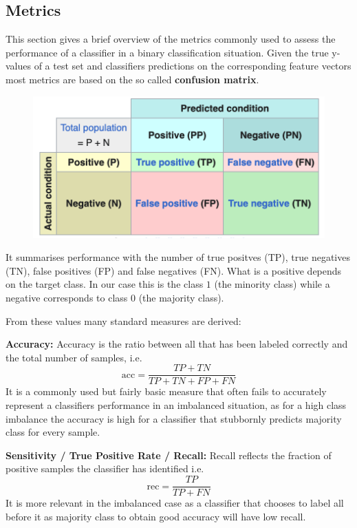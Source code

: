 
\subsection{Metrics}

This section gives a brief overview of the metrics commonly used to assess the performance of a classifier in a binary classification situation.
Given the true y-values of a test set and classifiers predictions on the corresponding feature vectors most metrics are based on the so called \textbf{confusion matrix}.

\begin{figure}[H]
	\centering
  	\includegraphics[width=0.75\linewidth]{assets/confusion_matrix.png}
  	\label{fig:confusion_matrix}
\end{figure}

It summarises performance with the number of true positves (TP), true negatives (TN), false positives (FP) and false negatives (FN). 
What is a positive depends on the target class. In our case this is the class $1$ (the minority class) while a negative corresponds to class $0$ (the majority class).

From these values many standard measures are derived:

\textbf{Accuracy:}
Accuracy is the ratio between all that has been labeled correctly and the total number of samples, i.e.
\[
	\text{acc} = \frac{TP + TN}{TP + TN + FP + FN}
\]
It is a commonly used but fairly basic measure that often fails to accurately represent a classifiers performance in an imbalanced situation,
as for a high class imbalance the accuracy is high for a classifier that stubbornly predicts majority class for every sample.

\textbf{Sensitivity / True Positive Rate / Recall:}
Recall reflects the fraction of positive samples the classifier has identified i.e.
\[
	\text{rec} = \frac{TP}{TP + FN}
\]
It is more relevant in the imbalanced case as a classifier that chooses to label all before it as majority class to obtain good accuracy will have low recall.

